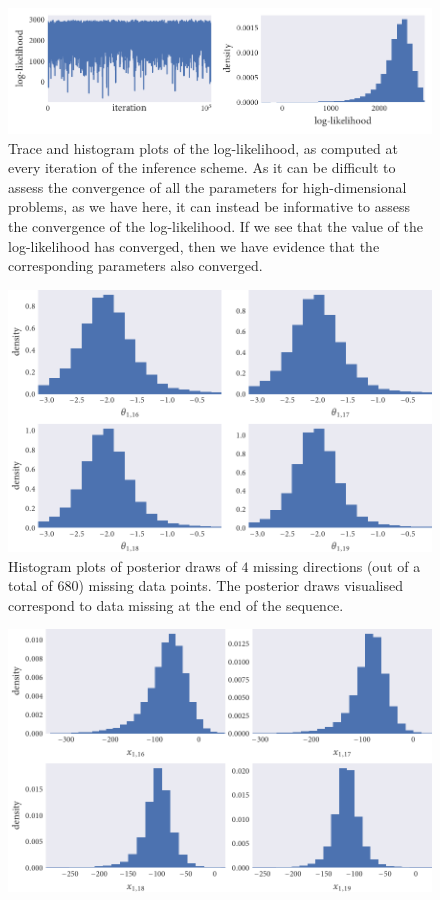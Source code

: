\begin{figure}[tb]
  \includegraphics{log_likelihood.pdf}
  \caption{Trace and histogram plots of the log-likelihood, as computed at
    every iteration of the inference scheme. As it can be difficult to assess
    the convergence of all the parameters for high-dimensional problems, as we have
    here, it can instead be informative to assess the convergence of the
    log-likelihood. If we see that the value of the log-likelihood has
    converged, then we have evidence that the corresponding parameters also
    converged.}
\end{figure}

\begin{figure}[tb]
  \includegraphics{dir_hist.pdf}
  \caption{Histogram plots of posterior draws of $4$ missing directions (out of
  a total of $680$) missing data points. The posterior draws visualised
  correspond to data missing at the end of the sequence.}
  \label{fig:dir_hist}
\end{figure}

\begin{figure}[tb]
  \includegraphics{x_hist.pdf}
  \caption{}
  \label{fig:x_hist}
\end{figure}










